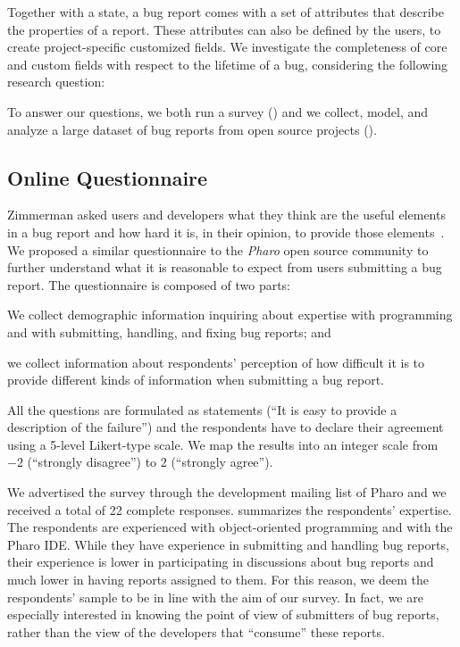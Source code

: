 
Together with a state, a bug report comes with a set of attributes that describe the properties of a report.
These attributes can also be defined by the users, to create project-specific customized fields.
We investigate the completeness of core and custom fields with respect to the lifetime of a bug, considering the following research question:


To answer our questions, we both run a survey () and we collect, model, and analyze a large dataset of bug reports from open source projects ().

\subsection{Online Questionnaire} \label{sec:model-survey}

Zimmerman \etal asked users and developers what they think are the useful elements in a bug report and how hard it is, in their opinion, to provide those elements~\cite{Zimm2010a}.
We proposed a similar questionnaire to the \emph{Pharo} open source community to further understand what it is reasonable to expect from users submitting a bug report.
The questionnaire is composed of two parts: \begin{inparaenum}[(1)]
\item We collect demographic information inquiring about expertise with programming and with submitting, handling, and fixing bug reports; and
\item we collect information about respondents' perception of how difficult it is to provide different kinds of information when submitting a bug report.
\end{inparaenum}
All the questions are formulated as statements (\eg ``It is easy to provide a description of the failure'') and the respondents have to declare their agreement using a 5-level Likert-type scale.
We map the results into an integer scale from $-2$ (\ie ``strongly disagree'') to $2$ (\ie ``strongly agree'').

We advertised the survey through the development mailing list of Pharo and we received a total of 22 complete responses.
 summarizes the respondents' expertise.
The respondents are experienced with object-oriented programming and with the Pharo IDE.
While they have experience in submitting and handling bug reports, their experience is lower in participating in discussions about bug reports and much lower in having reports assigned to them.
For this reason, we deem the respondents' sample to be in line with the aim of our survey.
In fact, we are especially interested in knowing the point of view of submitters of bug reports, rather than the view of the developers that ``consume'' these reports.

